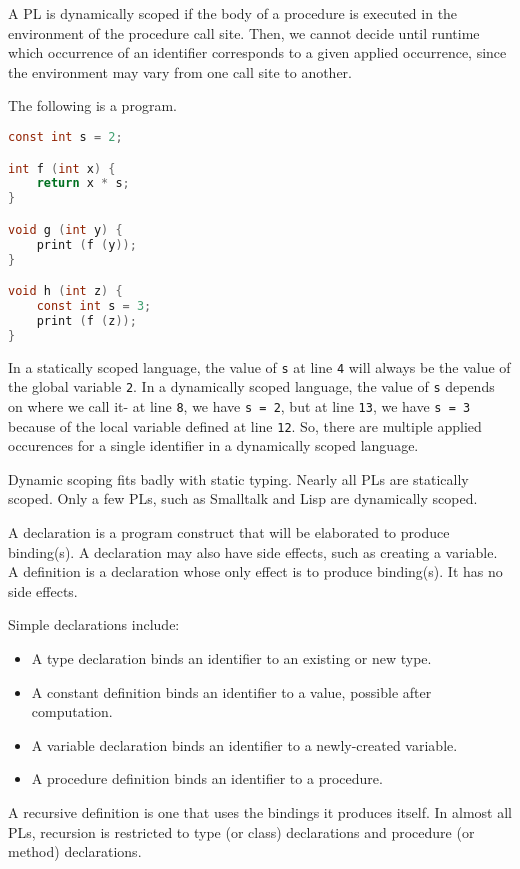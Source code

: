 \documentclass[a4paper, openany]{memoir}
\begin{document}
A PL is dynamically scoped if the body of a procedure is executed in the environment of the procedure call site. Then, we cannot decide until runtime which occurrence of an identifier corresponds to a given applied occurrence, since the environment may vary from one call site to another.

The following is a program.
\begin{lstlisting}[language=C]
const int s = 2;

int f (int x) {
    return x * s;
}

void g (int y) {
    print (f (y));
}

void h (int z) {
    const int s = 3;
    print (f (z));
}
\end{lstlisting}
In a statically scoped language, the value of \texttt{s} at line \texttt{4} will always be the value of the global variable \texttt{2}. In a dynamically scoped language, the value of \texttt{s} depends on where we call it- at line \texttt{8}, we have \texttt{s = 2}, but at line \texttt{13}, we have \texttt{s = 3} because of the local variable defined at line \texttt{12}. So, there are multiple applied occurences for a single identifier in a dynamically scoped language.

Dynamic scoping fits badly with static typing. Nearly all PLs are statically scoped. Only a few PLs, such as Smalltalk and Lisp are dynamically scoped.

A declaration is a program construct that will be elaborated to produce binding(s). A declaration may also have side effects, such as creating a variable. A definition is a declaration whose only effect is to produce binding(s). It has no side effects.

Simple declarations include:
\begin{itemize}
    \item A type declaration binds an identifier to an existing or new type.
    \item A constant definition binds an identifier to a value, possible after computation.
    \item A variable declaration binds an identifier to a newly-created variable.
    \item A procedure definition binds an identifier to a procedure.
\end{itemize}

A recursive definition is one that uses the bindings it produces itself. In almost all PLs, recursion is restricted to type (or class) declarations and procedure (or method) declarations. 
\end{document}
